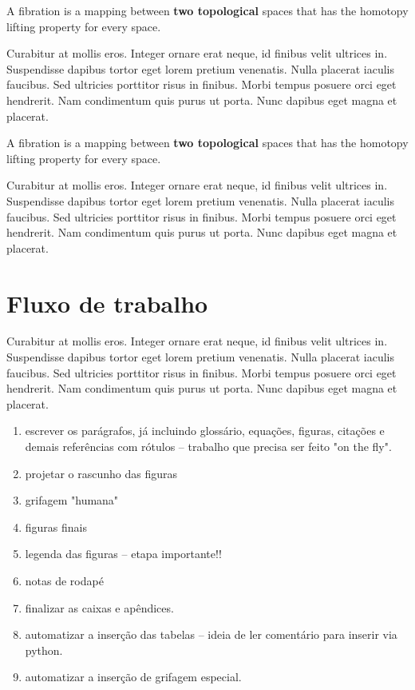 \documentclass[./main.tex]{subfiles}
\begin{document}
\begin{assumption}[Scale]
    A fibration is a mapping between \textbf{two topological} spaces that has the homotopy lifting property for every space.
\end{assumption}

\par Curabitur at mollis eros. Integer ornare erat neque, id finibus velit ultrices in. Suspendisse dapibus tortor eget lorem pretium venenatis. Nulla placerat iaculis faucibus. Sed ultricies porttitor risus in finibus. Morbi tempus posuere orci eget hendrerit. Nam condimentum quis purus ut porta. Nunc dapibus eget magna et placerat.

\begin{definition}[Simplicity]
    A fibration is a mapping between \textbf{two topological} spaces that has the homotopy lifting property for every space.
\end{definition}

\par Curabitur at mollis eros. Integer ornare erat neque, id finibus velit ultrices in. Suspendisse dapibus tortor eget lorem pretium venenatis. Nulla placerat iaculis faucibus. Sed ultricies porttitor risus in finibus. Morbi tempus posuere orci eget hendrerit. Nam condimentum quis purus ut porta. Nunc dapibus eget magna et placerat.

\section{Fluxo de trabalho}

\par Curabitur at mollis eros. Integer ornare erat neque, id finibus velit ultrices in. Suspendisse dapibus tortor eget lorem pretium venenatis. Nulla placerat iaculis faucibus. Sed ultricies porttitor risus in finibus. Morbi tempus posuere orci eget hendrerit. Nam condimentum quis purus ut porta. Nunc dapibus eget magna et placerat.

\begin{enumerate}
    \item escrever os parágrafos, já incluindo glossário, equações, figuras, citações e demais referências com rótulos -- trabalho que precisa ser feito "on the fly".
    \item projetar o rascunho das figuras
    \item grifagem "humana"
    \item figuras finais
    \item legenda das figuras -- etapa importante!!
    \item notas de rodapé
    \item finalizar as caixas e apêndices.
    \item automatizar a inserção das tabelas -- ideia de ler comentário para inserir via python.
    \item automatizar a inserção de grifagem especial.
\end{enumerate}
\end{document}
